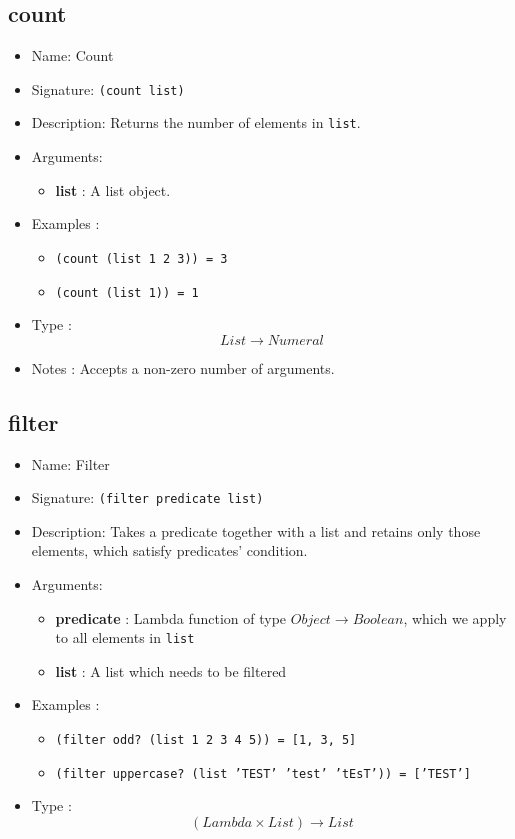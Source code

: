 \subsection{count}
\begin{itemize}
    \item Name: Count
    \item Signature: \texttt{(count list)}
    \item Description: Returns the number of elements in \texttt{list}.
    \item Arguments:
        \begin{itemize}
            \item \textbf{list} : A list object.
        \end{itemize}
    \item Examples :
        \begin{itemize}
            \item \texttt{(count (list 1 2 3)) = 3}
            \item \texttt{(count (list 1)) = 1}
        \end{itemize}
    \item Type : \[List \to Numeral\]
    \item Notes : Accepts a non-zero number of arguments.
\end{itemize}

\subsection{filter}
\begin{itemize}
    \item Name: Filter
    \item Signature: \texttt{(filter predicate list)}
    \item Description: Takes a predicate together with a list and retains only those elements, which satisfy predicates' condition.
    \item Arguments:
        \begin{itemize}
            \item \textbf{predicate} : Lambda function of type $Object \to Boolean$, which we apply to all elements in \texttt{list}
            \item \textbf{list} : A list which needs to be filtered
        \end{itemize}
    \item Examples :
        \begin{itemize}
            \item \texttt{(filter odd? (list 1 2 3 4 5)) = [1, 3, 5]}
            \item \texttt{(filter uppercase? (list 'TEST' 'test' 'tEsT')) = ['TEST']}
        \end{itemize}
    \item Type : \[(Lambda \times List) \to List\]
\end{itemize}

